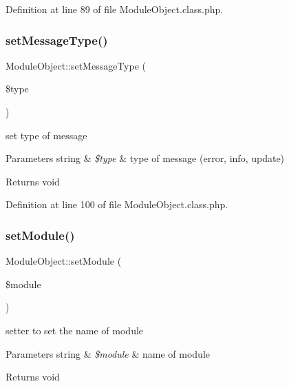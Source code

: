 Definition at line 89 of file Module\+Object.\+class.\+php.

\mbox{\label{classModuleObject_a9f65f760815bb7c6667a2e521578af10}} 
\subsubsection{\texorpdfstring{set\+Message\+Type()}{setMessageType()}}
{\footnotesize\ttfamily Module\+Object\+::set\+Message\+Type (\begin{DoxyParamCaption}\item[{}]{\$type }\end{DoxyParamCaption})}

set type of message 
\begin{DoxyParams}[1]{Parameters}
string & {\em \$type} & type of message (error, info, update) \\
\hline
\end{DoxyParams}
\begin{DoxyReturn}{Returns}
void 
\end{DoxyReturn}


Definition at line 100 of file Module\+Object.\+class.\+php.

\mbox{\label{classModuleObject_a610f40078a4c8590452eaedf794350ed}} 
\subsubsection{\texorpdfstring{set\+Module()}{setModule()}}
{\footnotesize\ttfamily Module\+Object\+::set\+Module (\begin{DoxyParamCaption}\item[{}]{\$module }\end{DoxyParamCaption})}

setter to set the name of module 
\begin{DoxyParams}[1]{Parameters}
string & {\em \$module} & name of module \\
\hline
\end{DoxyParams}
\begin{DoxyReturn}{Returns}
void 
\end{DoxyReturn}


